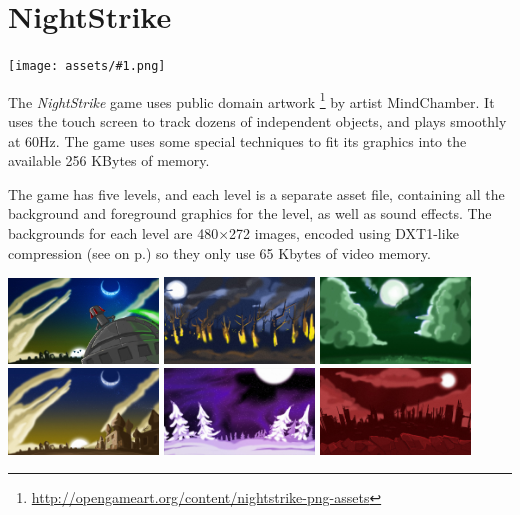 \documentclass[10pt]{book}
\newcommand{\png}[1]{
\begin{center}
\texttt{[image: assets/\#1.png]}
\end{center}
}
\newcommand{\xref}[1]{\textit{\nameref{#1}} on  p.\pageref{#1}}
\begin{document}
\newpage
\section{NightStrike}
\label{nightstrike}

\png{nightstrike}

The \textit{NightStrike} game uses public domain artwork
\footnote{\url{http://opengameart.org/content/nightstrike-png-assets}}
by artist MindChamber.
It uses the touch screen to track dozens of independent objects,
and plays smoothly at 60Hz.
The game uses some special techniques to fit its graphics into the available 256 KBytes of memory.

The game has five levels, and each level is a separate asset file, containing all the background and foreground graphics
for the level, as well as sound effects.
The backgrounds for each level are 480$\times$272 images, encoded using DXT1-like compression
(see \xref{dxt1})
so they only use 65 Kbytes of video memory.

\begin{center}
\includegraphics[width=0.3\textwidth]{assets/nightstrike/backgrounds/welcome.jpg}
\includegraphics[width=0.3\textwidth]{assets/nightstrike/backgrounds/burningwoods.jpg}
\includegraphics[width=0.3\textwidth]{assets/nightstrike/backgrounds/greenland.jpg}
\includegraphics[width=0.3\textwidth]{assets/nightstrike/backgrounds/nightfall.jpg}
\includegraphics[width=0.3\textwidth]{assets/nightstrike/backgrounds/purplesnow.jpg}
\includegraphics[width=0.3\textwidth]{assets/nightstrike/backgrounds/redworld.jpg}
\end{center}
\end{document}
